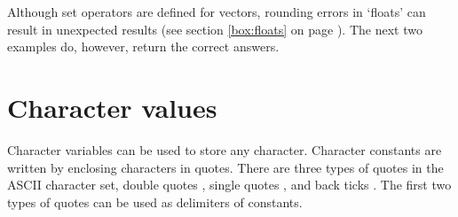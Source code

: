 \documentclass[krantz2]{krantz}\usepackage{knitr}
\begin{document}
\begin{explainbox}
\begin{knitrout}\footnotesize
{}\color{fgcolor}
\end{knitrout}

Although set operators are defined for  vectors, rounding errors in `floats' can result in unexpected results (see section \ref{box:floats} on page \pageref{box:floats}). The next two examples do, however, return the correct answers.

\begin{knitrout}\footnotesize
{}\color{fgcolor}
\end{knitrout}

\end{explainbox}

\section{Character values}\label{sec:calc:character}
Character variables can be used to store any character. Character constants are written by enclosing characters in quotes. There are three types of quotes in the ASCII character set, double quotes , single quotes , and back ticks . The first two types of quotes can be used as delimiters of  constants.
\end{document}
